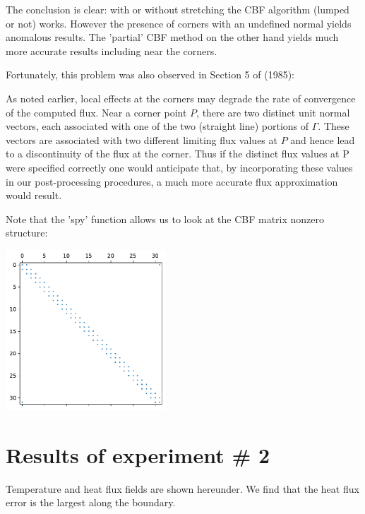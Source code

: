 The conclusion is clear: with or without stretching the CBF algorithm (lumped or not) works. 
However the presence of corners with an undefined normal yields anomalous results.
The 'partial' CBF method on the other hand yields much more accurate results including near the corners. 

Fortunately, this problem was also observed in Section 5 of \textcite{cacs85} (1985):
\begin{displayquote}
As noted earlier, local effects at the corners may degrade the rate of convergence of the
computed flux. Near a corner point $P$, there are two distinct unit normal vectors, each
associated with one of the two (straight line) portions of $\Gamma$. These vectors are associated with
two different limiting flux values at $P$ and hence lead to a discontinuity of the flux at the
corner. Thus if the distinct flux values at P were specified correctly one would anticipate that,
by incorporating these values in our post-processing procedures, a much more accurate flux
approximation would result.
\end{displayquote}

Note that the 'spy' function allows us to look at the CBF matrix nonzero structure:
\begin{center}
\includegraphics[width=6cm]{python_codes/fieldstone_173/results/exp1/matrix.pdf}
\end{center}




\newpage
\section*{Results of experiment \# 2}

Temperature and heat flux fields are shown hereunder. 
We find that the heat flux error is the largest along the boundary.

